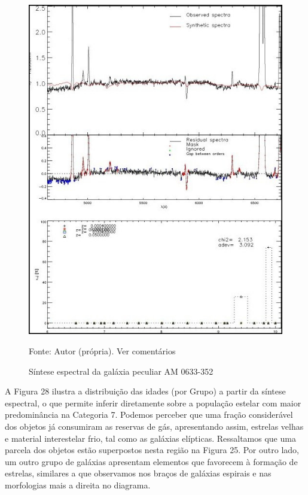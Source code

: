 \begin{figure}[H]
\centering	
\caption{Síntese espectral da galáxia peculiar AM 0633-352}
\includegraphics[width=1.1\textwidth]{figuras/ativas.jpg}
\begin{center}
   \normalsize Fonte: Autor (própria). Ver comentários %
    \end{center}
\label{fig:sbmt-moses}
\end{figure}

A Figura 28 ilustra a distribuição das idades (por Grupo) a partir da síntese espectral, o que permite inferir diretamente sobre a população estelar com maior predominância na Categoria 7. Podemos perceber que uma fração considerável dos objetos já consumiram as reservas de gás, apresentando assim, estrelas velhas e material interestelar frio, tal como as galáxias
elípticas. Ressaltamos que uma parcela dos objetos estão superpostos nesta região na Figura 25. Por outro lado, um outro grupo de galáxias apresentam elementos que favorecem à formação de estrelas, similares a que observamos
nos braços de galáxias espirais e nas morfologias mais a direita no diagrama. 


